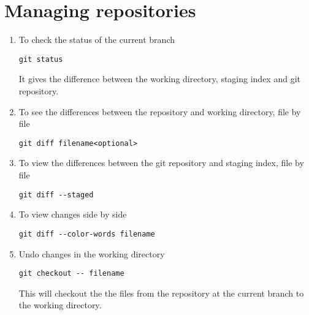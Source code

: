\documentclass[paper=a4, fontsize=12pt]{scrartcl}
\begin{document}
\section*{Managing repositories}
\begin{enumerate}
\item To check the status of the current branch
\begin{lstlisting}
git status
\end{lstlisting}
It gives the difference between the working directory, staging index and git repository.
\item To see the differences between the repository and working directory, file by file
\begin{lstlisting}
git diff filename<optional>
\end{lstlisting}
\item To view the differences between the git repository and staging index, file by file
\begin{lstlisting}
git diff --staged
\end{lstlisting}
\item To view changes side by side
\begin{lstlisting}
git diff --color-words filename
\end{lstlisting}
\item Undo changes in the working directory
\begin{lstlisting}
git checkout -- filename
\end{lstlisting}
This will checkout the the files from the repository at the current branch to the working directory.
\end{enumerate}
\end{document}
